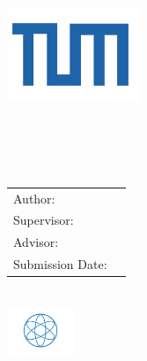 \begin{titlepage}
\centering
\vspace{40mm}
\includegraphics[width=40mm]{./includes/logo/tum} \\
\vspace{5mm}
{\huge\MakeUppercase{\getFacultyger{}}}\\
\vspace{5mm}
{\large\MakeUppercase{\getUniversity{}}}\\
\vspace{20mm}
{\Large \getDoctype{}} \\
\vspace{15mm}
{\huge\bfseries \getTitleger{}} \\
\vspace{15mm}
\begin{tabular}{l l}
Author: & \getAuthor{} \\
Supervisor: & \getSupervisor{} \\
Advisor: & \getAdvisor{} \\
Submission Date: & \getSubmissionDate{} \\
\end{tabular}
\vspace{10mm} \\
\includegraphics[width=20mm]{./includes/logo/physics}
\end{titlepage}